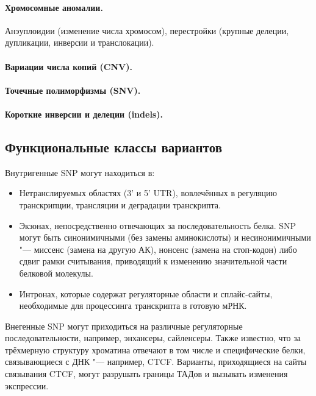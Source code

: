 \documentclass[a4paper,12pt]{article}
\begin{document}
\paragraph{Хромосомные аномалии.}
Анэуплоидии (изменение числа хромосом), перестройки (крупные делеции, дупликации, инверсии и транслокации).

\paragraph{Вариации числа копий (CNV).}

\paragraph{Точечные полиморфизмы (SNV).}

\paragraph{Короткие инверсии и делеции (indels).}

\subsection{Функциональные классы вариантов}

Внутригенные SNP могут находиться в:

\begin{itemize}
\item Нетранслируемых областях (3' и 5' UTR), вовлечённых в регуляцию транскрипции, трансляции и деградации транскрипта.
\item Экзонах, непосредственно отвечающих за последовательность белка.
SNP могут быть синонимичными (без замены аминокислоты) и несинонимичными "--- миссенс (замена на другую АК), нонсенс (замена на стоп-кодон) либо сдвиг рамки считывания, приводящий к изменению значительной части белковой молекулы.
\item Интронах, которые содержат регуляторные области и сплайс-сайты, необходимые для процессинга транскрипта в готовую мРНК.
\end{itemize}

Внегенные SNP могут приходиться на различные регуляторные последовательности, например, энхансеры, сайленсеры.
Также известно, что за трёхмерную структуру хроматина отвечают в том числе и специфические белки, связывающиеся с ДНК "--- например, CTCF\cite{wutz}.
Варианты, приходящиеся на сайты связывания CTCF, могут разрушать границы ТАДов и вызывать изменения экспрессии.
\end{document}
